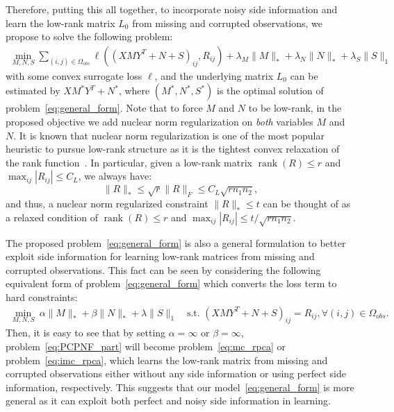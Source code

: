 \documentclass[twoside,11pt]{article}
\def\Obs{\Omega_{obs}}
\newcommand\rank[1]{{\operatorname{rank}}(#1)}
\def\realL{L_0}
\def\optM{M^*}
\def\optN{N^*}
\def\optS{S^*}
\begin{document}
Therefore, putting this all together, to incorporate noisy side information
and learn the low-rank matrix $\realL$ from
missing and corrupted observations, we propose to solve the following problem:
\begin{align}
  \min_{M, N, S} \sum_{(i, j) \in \Obs} \ell((XMY^T + N + S)_{ij}, R_{ij}) +
  \lambda_M \|M\|_* + \lambda_N \|N\|_* + \lambda_S \|S\|_1
  \label{eq:general_form}
\end{align}
with some convex surrogate loss $\ell$, and the underlying matrix $\realL$ can
be estimated by $XM^*Y^T+N^*$, where $(\optM, \optN, \optS)$ is the optimal solution
of problem~\eqref{eq:general_form}.
Note that to force $M$ and $N$ to be low-rank, in the proposed objective we add
nuclear norm regularization on {\it both} variables $M$ and $N$.
It is known that nuclear norm regularization is one of the most popular heuristic to
pursue low-rank structure as it is the tightest convex relaxation
of the rank function~\citep{Fazel01a}.
In particular, given a low-rank matrix $\rank{R} \leq r$ and
$\max_{ij}|R_{ij}| \leq C_L$, we always have:
\begin{equation*}
  \|R\|_* \leq \sqrt{r}\|R\|_F \leq C_L \sqrt{rn_1n_2},
\end{equation*}
and thus, a nuclear norm regularized constraint $\|R\|_* \leq t$ can be thought
of as a relaxed condition of $\rank{R} \leq r$ and
$\max_{ij}|R_{ij}| \leq t/\sqrt{rn_1n_2}$.


The proposed problem~\eqref{eq:general_form} is also
a general formulation to better exploit side information for learning low-rank matrices
from missing and corrupted observations.
This fact can be seen by considering
the following equivalent form of problem~\eqref{eq:general_form}
which converts the loss term to hard constraints:
\begin{align}
  \min_{M, N, S} \ \alpha\|M\|_* + \beta\|N\|_* + \lambda\|S\|_1 \quad
  \text{s.t. } (XMY^T+N+S)_{ij} = R_{ij}, \forall (i, j) \in \Obs.
  \label{eq:PCPNF_part}
\end{align}
Then, it is easy to see that by setting $\alpha = \infty$ or $\beta = \infty$, problem~\eqref{eq:PCPNF_part}
will become problem~\eqref{eq:mc_rpca} or problem~\eqref{eq:imc_rpca}, which learns the low-rank matrix
from missing and corrupted observations either without any side information or using
perfect side information, respectively.
This suggests that our model~\eqref{eq:general_form} %
is more general as it can exploit both perfect and noisy side information in learning.
\end{document}
